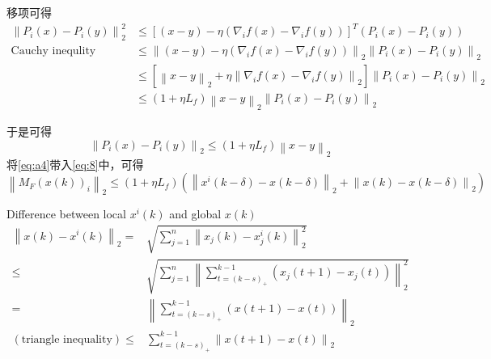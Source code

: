 \documentclass{ctexart}
\begin{document}
移项可得
\begin{align}\label{eq:a3}
  \left\|P_i \left(x\right) - P_i \left(y\right) \right\|_2^2 & \leq \left[ \left(x-y\right) - \eta\left(\nabla_i f\left(x\right) -\nabla_i f\left(y\right) \right) \right]^T \left( P_i \left(x\right) - P_i \left(y\right) \right)\nonumber \\
 \text{Cauchy inequlity} & \leq \left\| \left( x-y \right) - \eta \left( \nabla_i f\left(x\right) - \nabla_i f\left(y\right) \right) \right\|_2 \left\| P_i \left(x\right) - P_i \left(y\right) \right\|_2 \nonumber \\
   & \leq \left[ \left\| x-y \right\|_2 + \eta \left\| \nabla_i f\left(x\right) - \nabla_i f\left(y\right) \right\|_2 \right] \left\| P_i \left(x\right) - P_i \left(y\right) \right\|_2 \nonumber\\
   & \leq \left( 1+\eta L_f \right) \left\| x-y \right\|_2 \left\| P_i \left(x\right) - P_i \left(y\right) \right\|_2
\end{align}

于是可得
\begin{equation}\label{eq:a4}
  \left\| P_i \left(x\right) - P_i \left(y\right)\right\|_2 \leq \left(1+\eta L_f\right)\left\| x-y \right\|_2
\end{equation}
将\ref{eq:a4}带入\ref{eq:8}中，可得
\begin{equation}\label{eq:a5}
  \left\|M_F \left( x \left(k\right) \right)_i\right\|_2 \leq \left(1+\eta L_f\right)\left( \left\| x^i \left(k-\delta\right) - x\left(k-\delta\right)\right\|_2 + \left\| x\left(k\right) - x\left(k-\delta\right) \right\|_2 \right)
\end{equation}

Difference between local $x^i \left(k\right)$ and global $x\left(k\right)$
\begin{align}\label{eq:15}
  \left\| x\left( k \right) - x^{i}\left(k\right) \right\|_2 = & \sqrt{\sum\limits_{j=1}^{n} \left\| x_j \left(k\right) - x_j^i\left(k\right) \right\|_2^2} \nonumber \\
  \leq & \sqrt{\sum\limits_{j=1}^{n} \left\| \sum\limits_{t = \left( k-s \right)_+ }^{k-1}\left( x_j \left( t+1 \right) - x_j \left( t \right) \right) \right\|_2^2} \nonumber\\
  = & \left\| \sum\limits_{t = \left( k-s \right)_+ }^{k-1} \left( x\left( t+1 \right) - x\left(t\right) \right) \right\|_2 \nonumber \\
  \left(\text{triangle inequality}\right)\leq & \sum\limits_{t = \left( k-s \right)_+}^{k-1} \left\| x\left( t+1 \right) - x\left(t\right)\right\|_2
\end{align}
\end{document}
